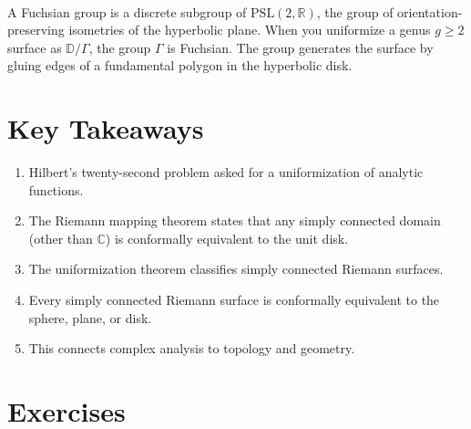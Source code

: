 \begin{description}[font=\bfseries, leftmargin=2em, style=nextline]
\item[Q: What is a Fuchsian group?]\hfill\\
A Fuchsian group is a discrete subgroup of $\mathrm{PSL}(2,\mathbb{R})$, the group of orientation-preserving isometries of the hyperbolic plane. When you uniformize a genus $g \geq 2$ surface as $\mathbb{D}/\Gamma$, the group $\Gamma$ is Fuchsian. The group generates the surface by gluing edges of a fundamental polygon in the hyperbolic disk.

\end{description}

\section*{Key Takeaways}

\begin{enumerate}
    \item Hilbert's twenty-second problem asked for a uniformization of analytic functions.
    \item The Riemann mapping theorem states that any simply connected domain (other than $\mathbb{C}$) is conformally equivalent to the unit disk.
    \item The uniformization theorem classifies simply connected Riemann surfaces.
    \item Every simply connected Riemann surface is conformally equivalent to the sphere, plane, or disk.
    \item This connects complex analysis to topology and geometry.
\end{enumerate}

\section{Exercises}

